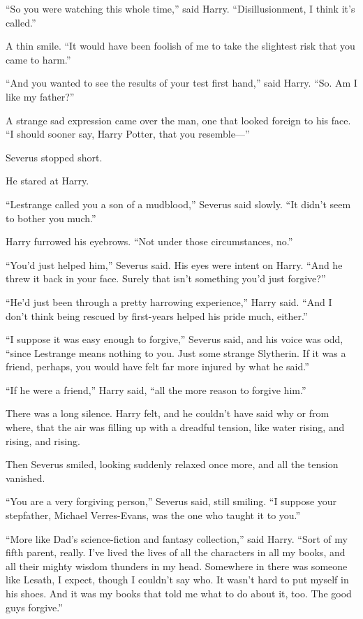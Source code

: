 “So you were watching this whole time,” said Harry. “Disillusionment, I think it’s called.”

A thin smile. “It would have been foolish of me to take the slightest risk that you came to harm.”

“And you wanted to see the results of your test first hand,” said Harry. “So. Am I like my father?”

A strange sad expression came over the man, one that looked foreign to his face. “I should sooner say, Harry Potter, that you resemble—”

Severus stopped short.

He stared at Harry.

“Lestrange called you a son of a mudblood,” Severus said slowly. “It didn’t seem to bother you much.”

Harry furrowed his eyebrows. “Not under those circumstances, no.”

“You’d just helped him,” Severus said. His eyes were intent on Harry. “And he threw it back in your face. Surely that isn’t something you’d just forgive?”

“He’d just been through a pretty harrowing experience,” Harry said. “And I don’t think being rescued by first-years helped his pride much, either.”

“I suppose it was easy enough to forgive,” Severus said, and his voice was odd, “since Lestrange means nothing to you. Just some strange Slytherin. If it was a friend, perhaps, you would have felt far more injured by what he said.”

“If he were a friend,” Harry said, “all the more reason to forgive him.”

There was a long silence. Harry felt, and he couldn’t have said why or from where, that the air was filling up with a dreadful tension, like water rising, and rising, and rising.

Then Severus smiled, looking suddenly relaxed once more, and all the tension vanished.

“You are a very forgiving person,” Severus said, still smiling. “I suppose your stepfather, Michael Verres-Evans, was the one who taught it to you.”

“More like Dad’s science-fiction and fantasy collection,” said Harry. “Sort of my fifth parent, really. I’ve lived the lives of all the characters in all my books, and all their mighty wisdom thunders in my head. Somewhere in there was someone like Lesath, I expect, though I couldn’t say who. It wasn’t hard to put myself in his shoes. And it was my books that told me what to do about it, too. The good guys forgive.”

